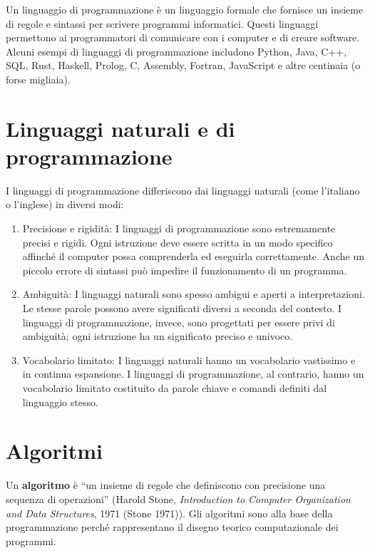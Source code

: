\documentclass[
  letterpaper,
]{scrbook}
\begin{document}
Un linguaggio di programmazione è un linguaggio formale che fornisce un
insieme di regole e sintassi per scrivere programmi informatici. Questi
linguaggi permettono ai programmatori di comunicare con i computer e di
creare software. Alcuni esempi di linguaggi di programmazione includono
Python, Java, C++, SQL, Rust, Haskell, Prolog, C, Assembly, Fortran,
JavaScript e altre centinaia (o forse migliaia).

\section{Linguaggi naturali e di
programmazione}\label{linguaggi-naturali-e-di-programmazione}

I linguaggi di programmazione differiscono dai linguaggi naturali (come
l'italiano o l'inglese) in diversi modi:

\begin{enumerate}
\def\labelenumi{\arabic{enumi}.}
\item
  Precisione e rigidità: I linguaggi di programmazione sono estremamente
  precisi e rigidi. Ogni istruzione deve essere scritta in un modo
  specifico affinché il computer possa comprenderla ed eseguirla
  correttamente. Anche un piccolo errore di sintassi può impedire il
  funzionamento di un programma.
\item
  Ambiguità: I linguaggi naturali sono spesso ambigui e aperti a
  interpretazioni. Le stesse parole possono avere significati diversi a
  seconda del contesto. I linguaggi di programmazione, invece, sono
  progettati per essere privi di ambiguità; ogni istruzione ha un
  significato preciso e univoco.
\item
  Vocabolario limitato: I linguaggi naturali hanno un vocabolario
  vastissimo e in continua espansione. I linguaggi di programmazione, al
  contrario, hanno un vocabolario limitato costituito da parole chiave e
  comandi definiti dal linguaggio stesso.
\end{enumerate}

\section{Algoritmi}\label{algoritmi}

Un \textbf{algoritmo} è ``un insieme di regole che definiscono con
precisione una sequenza di operazioni'' (Harold Stone,
\emph{Introduction to Computer Organization and Data Structures}, 1971
(Stone 1971)). Gli algoritmi sono alla base della programmazione perché
rappresentano il disegno teorico computazionale dei programmi.
\end{document}
